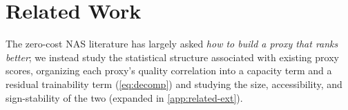 \section{Related Work}
\label{sec:related}


The zero-cost NAS literature has largely asked \emph{how to build a proxy
that ranks better}; we instead study the statistical structure associated with
existing proxy scores, organizing
each proxy's quality correlation into a capacity term and a residual trainability
term (\cref{eq:decomp}) and studying the size, accessibility, and sign-stability of
the two (expanded in \cref{app:related-ext}).

